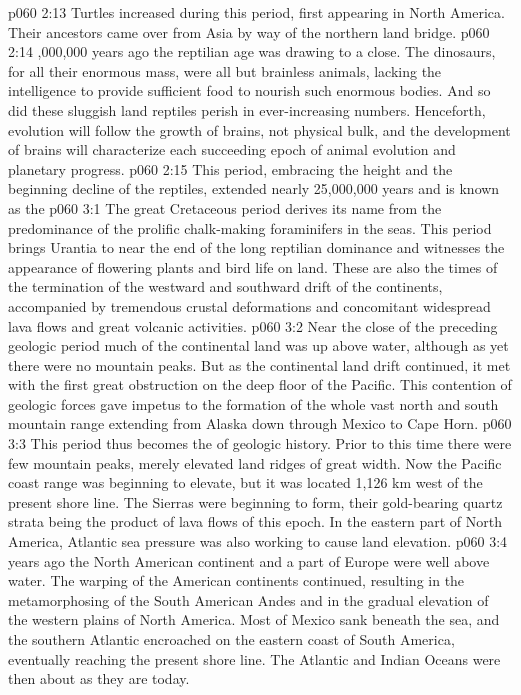 \vs p060 2:13 Turtles increased during this period, first appearing in North America. Their ancestors came over from Asia by way of the northern land bridge.
\vs p060 2:14 ,000,000 years ago the reptilian age was drawing to a close. The dinosaurs, for all their enormous mass, were all but brainless animals, lacking the intelligence to provide sufficient food to nourish such enormous bodies. And so did these sluggish land reptiles perish in ever\hyp{}increasing numbers. Henceforth, evolution will follow the growth of brains, not physical bulk, and the development of brains will characterize each succeeding epoch of animal evolution and planetary progress.
\vs p060 2:15 \pc This period, embracing the height and the beginning decline of the reptiles, extended nearly 25,000,000 years and is known as the 
\vs p060 3:1 The great Cretaceous period derives its name from the predominance of the prolific chalk\hyp{}making foraminifers in the seas. This period brings Urantia to near the end of the long reptilian dominance and witnesses the appearance of flowering plants and bird life on land. These are also the times of the termination of the westward and southward drift of the continents, accompanied by tremendous crustal deformations and concomitant widespread lava flows and great volcanic activities.
\vs p060 3:2 Near the close of the preceding geologic period much of the continental land was up above water, although as yet there were no mountain peaks. But as the continental land drift continued, it met with the first great obstruction on the deep floor of the Pacific. This contention of geologic forces gave impetus to the formation of the whole vast north and south mountain range extending from Alaska down through Mexico to Cape Horn.
\vs p060 3:3 This period thus becomes the  of geologic history. Prior to this time there were few mountain peaks, merely elevated land ridges of great width. Now the Pacific coast range was beginning to elevate, but it was located 1,126 km west of the present shore line. The Sierras were beginning to form, their gold\hyp{}bearing quartz strata being the product of lava flows of this epoch. In the eastern part of North America, Atlantic sea pressure was also working to cause land elevation.
\vs p060 3:4 \pc {} years ago the North American continent and a part of Europe were well above water. The warping of the American continents continued, resulting in the metamorphosing of the South American Andes and in the gradual elevation of the western plains of North America. Most of Mexico sank beneath the sea, and the southern Atlantic encroached on the eastern coast of South America, eventually reaching the present shore line. The Atlantic and Indian Oceans were then about as they are today.
